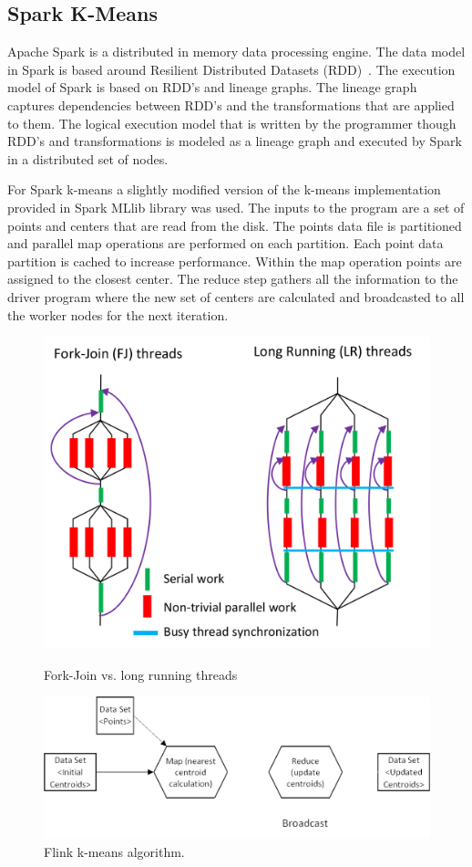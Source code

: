 \documentclass[10pt, conference, compsocconf]{IEEEtran}
\begin{document}
\subsection{Spark K-Means}
Apache Spark is a distributed in memory data processing engine. The data model in Spark is based around Resilient Distributed Datasets (RDD)~\cite{zaharia2012resilient}. The execution model of Spark is based on RDD’s and lineage graphs. The lineage graph captures dependencies between RDD’s and the transformations that are applied to them. The logical execution model that is written by the programmer though RDD’s and transformations is modeled as a lineage graph and executed by Spark in a distributed set of nodes.

For Spark k-means a slightly modified version of the k-means implementation provided in Spark MLlib library was used. The inputs to the program are a set of points and centers that are read from the disk. The points data file is partitioned and parallel map operations are performed on each partition. Each point data partition is cached to increase performance. Within the map operation points are assigned to the closest center. The reduce step gathers all the information to the driver program where the new set of centers are calculated and broadcasted to all the worker nodes for the next iteration. 

\begin{figure}[!htb]
    \centering
    \begin{minipage}{.49\textwidth}
        \centering        
        \includegraphics[width=0.6\columnwidth]{images/fig_fj_vs_lrt}
        \caption{Fork-Join vs. long running threads}
        \label{fig:fig_fj_vs_lrt}
    \end{minipage}
    \hspace{1.4mm}
    \begin{minipage}{0.49\textwidth}
        \centering
        \includegraphics[width=0.9\columnwidth]{images/fig_kmeans_dataflow}
        \caption{Flink k-means algorithm.}
        \label{fig:fig_flink_kmeans}
    \end{minipage}   
\end{figure}
\end{document}
